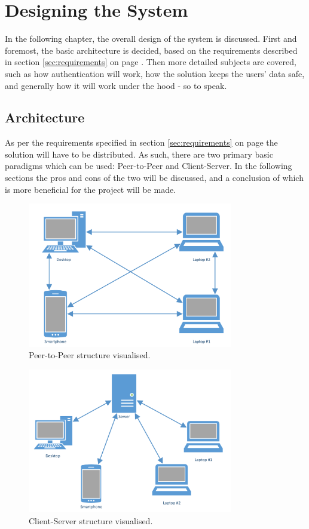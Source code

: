 \chapter{Designing the System}
	\label{chap:design}
	In the following chapter, the overall design of the system is discussed. First and foremost, the basic architecture is decided, based on the requirements described in section \ref{sec:requirements} on page \pageref{sec:requirements}. Then more detailed subjects are covered, such as how authentication will work, how the solution keeps the users' data safe, and generally how it will work under the hood - so to speak.

	\section{Architecture}
		\label{sec:arch}
		As per the requirements specified in section \ref{sec:requirements} on page \pageref{sec:requirements} the solution will have to be distributed. As such, there are two primary basic paradigms which can be used: Peer-to-Peer and Client-Server. In the following sections the pros and cons of the two will be discussed, and a conclusion of which is more beneficial for the project will be made.

		\begin{figure}[p]
			\centering
			\includegraphics[width=0.8\textwidth]{figures/design/PeerToPeer.pdf}
			\caption{Peer-to-Peer structure visualised.}
			\label{fig:peertopeer}
		\end{figure}

		\begin{figure}[p]
			\centering
			\includegraphics[width=0.8\textwidth]{figures/design/ClientServer.pdf}
			\caption{Client-Server structure visualised.}
			\label{fig:clientserver}
		\end{figure}


